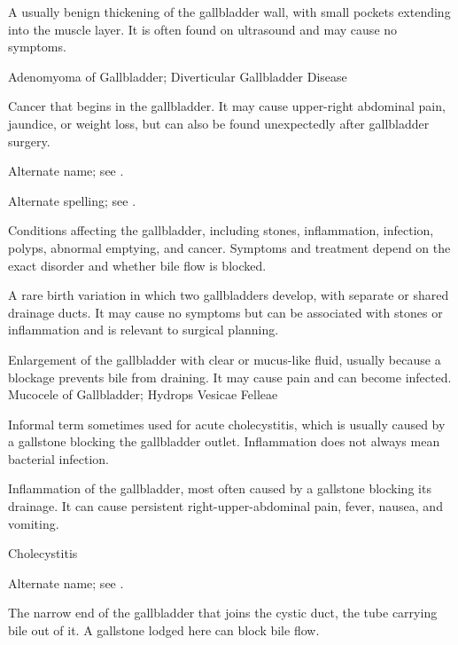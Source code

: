  A usually benign thickening of the gallbladder wall, with small pockets extending into the muscle layer. It is often found on ultrasound and may cause no symptoms.

\synonyms
Adenomyoma of Gallbladder; Diverticular Gallbladder Disease

 Cancer that begins in the gallbladder. It may cause upper-right abdominal pain, jaundice, or weight loss, but can also be found unexpectedly after gallbladder surgery.

 Alternate name; see .

 Alternate spelling; see .

 Conditions affecting the gallbladder, including stones, inflammation, infection, polyps, abnormal emptying, and cancer. Symptoms and treatment depend on the exact disorder and whether bile flow is blocked.

 A rare birth variation in which two gallbladders develop, with separate or shared drainage ducts. It may cause no symptoms but can be associated with stones or inflammation and is relevant to surgical planning.

 Enlargement of the gallbladder with clear or mucus-like fluid, usually because a blockage prevents bile from draining. It may cause pain and can become infected.
\synonyms
Mucocele of Gallbladder; Hydrops Vesicae Felleae

 Informal term sometimes used for acute cholecystitis, which is usually caused by a gallstone blocking the gallbladder outlet. Inflammation does not always mean bacterial infection.

 Inflammation of the gallbladder, most often caused by a gallstone blocking its drainage. It can cause persistent right-upper-abdominal pain, fever, nausea, and vomiting.

\synonyms
Cholecystitis

 Alternate name; see .

 The narrow end of the gallbladder that joins the cystic duct, the tube carrying bile out of it. A gallstone lodged here can block bile flow.

